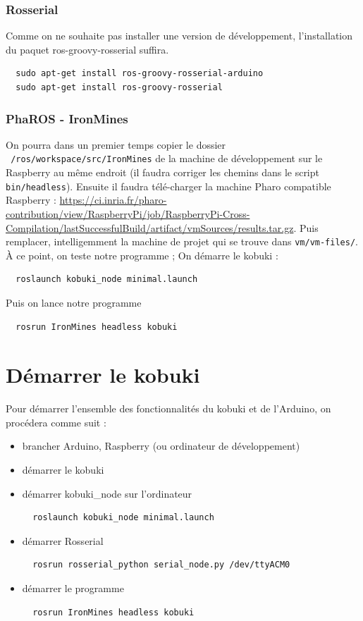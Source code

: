 \documentclass[a4paper, 11pt]{article}
\begin{document}
\subsubsection{Rosserial}
Comme on ne souhaite pas installer une version de développement,
l'installation du paquet ros-groovy-rosserial suffira.
\begin{lstlisting}
  sudo apt-get install ros-groovy-rosserial-arduino
  sudo apt-get install ros-groovy-rosserial
\end{lstlisting}

\subsubsection{PhaROS - IronMines}

On pourra dans un premier temps copier le dossier
\texttt{~/ros/workspace/src/IronMines} de la machine de développement
sur le Raspberry au même endroit (il faudra corriger les chemins dans
le script \texttt{bin/headless}). Ensuite il faudra télé-charger la
machine Pharo compatible Raspberry :
\url{https://ci.inria.fr/pharo-contribution/view/RaspberryPi/job/RaspberryPi-Cross-Compilation/lastSuccessfulBuild/artifact/vmSources/results.tar.gz}.
Puis remplacer, intelligemment la machine de projet qui se trouve dans
\texttt{vm/vm-files/}.
À ce point, on teste notre programme ; On démarre le kobuki :
\begin{verbatim}
  roslaunch kobuki_node minimal.launch
\end{verbatim}
Puis on lance notre programme
\begin{verbatim}
  rosrun IronMines headless kobuki
\end{verbatim}

\section{Démarrer le kobuki}

Pour démarrer l'ensemble des fonctionnalités du kobuki et de
l'Arduino, on procédera comme suit :
\begin{itemize}
\item brancher Arduino, Raspberry (ou ordinateur de développement)
\item démarrer le kobuki
\item démarrer kobuki\_node sur l'ordinateur
\begin{verbatim}
  roslaunch kobuki_node minimal.launch
\end{verbatim}
\item démarrer Rosserial
\begin{verbatim}
  rosrun rosserial_python serial_node.py /dev/ttyACM0
\end{verbatim}
\item démarrer le programme
\begin{verbatim}
  rosrun IronMines headless kobuki
\end{verbatim}
\end{itemize}
\end{document}
